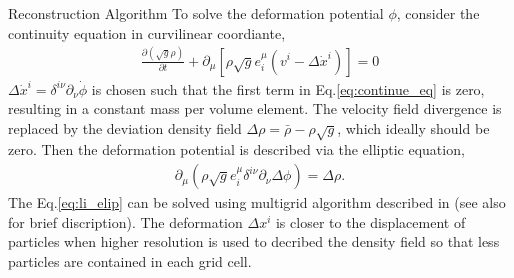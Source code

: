 \begin{section}{Reconstruction Algorithm}
To solve the deformation potential $\phi$, consider the continuity equation 
in curvilinear coordiante,
\begin{align}
 \label{eq:continue_eq}
    \frac{\partial (\sqrt{g} \rho) }{\partial t}+
    \partial_\mu \left[\rho \sqrt{g} e^\mu _i \left(v^i - 
    \Delta \dot{x}^i \right) \right] =0
\end{align}
$\Delta \dot{x}^i=\delta ^{i\nu}\partial _\nu \dot{\phi}$ is chosen such that the 
first term in Eq.\ref{eq:continue_eq} is zero, resulting in a constant mass 
per volume element. 
The velocity field divergence is replaced by the deviation density field 
$\Delta \rho = \bar{\rho}-\rho \sqrt{g}$, which ideally should be zero. 
Then the deformation potential is described via the elliptic equation,
\begin{align}
 \label{eq:li_elip}
    \partial _\mu (\rho \sqrt{g} e^\mu _i \delta^{i\nu}
    \partial_\nu \Delta \phi)=\Delta \rho.
\end{align}
The Eq.\ref{eq:li_elip} can be solved using multigrid algorithm described in 
\cite{bib:Pen1995,bib:Pen1998} (see also \cite{bib:ZhuH2016} for brief discription). 
The deformation $\Delta x^i$ is closer to the displacement of particles when 
higher resolution is used to decribed the density field so that less particles are 
contained in each grid cell.
\end{section}

